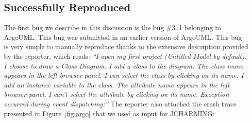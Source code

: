 \documentclass[times, doublespace]{smrauth}
\begin{document}
\subsection{Successfully Reproduced}

The first bug we describe in this discussion is the bug \#311
belonging to ArgoUML. This bug was submitted in an earlier
version of ArgoUML. This bug is very simple to manually
reproduce thanks to the extensive description provided by the
reporter, which reads: {\it ``I open my first project (Untitled Model by default). I choose
to draw a Class Diagram. I add a class to the diagram. The
class name appears in the left browser panel. I can select the
class by clicking on its name. I add an instance variable to the
class. The attribute name appears in the left browser panel. I
can't select the attribute by clicking on its name. Exception
occurred during event dispatching:''}
The reporter also attached the crash trace presented in Figure~\ref{fig:argo} that we used as input for JCHARMING:
\end{document}
